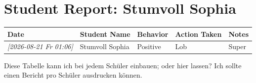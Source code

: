 \documentclass[11pt]{article}
\begin{document}
\section{Student Report: Stumvoll Sophia}
\label{sec:orge22b429}

\begin{table}[htbp]
\label{tab:org284cc3c}
\centering
\begin{tabular}{lllll}
Date & Student Name & Behavior & Action Taken & Notes\\
\hline
\textit{{[}2026-08-21 Fr 01:06]} & Stumvoll Sophia & Positive & Lob & Super\\
\end{tabular}
\end{table}


Diese Tabelle kann ich bei jedem Schüler einbauen; oder hier lassen? Ich sollte einen Bericht pro Schüler ausdrucken können.
\end{document}
